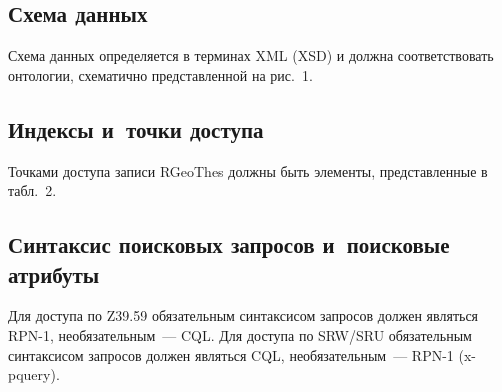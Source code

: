 \begin{multicols}{2}
  \subsection{Схема данных}
  
  Схема данных определяется в терминах {XML} (XSD) и должна соответствовать 
онтологии, схематично представленной на рис.~1.
  
  \subsection{Индексы и~точки доступа}
  
  Точками доступа записи \mbox{RGeoThes} должны быть элементы, представленные в 
табл.~2.
  
  \subsection{Синтаксис поисковых запросов и~поисковые атрибуты}
  
  Для доступа по Z39.59 обязательным синтаксисом запросов должен являться 
RPN-1, необязательным~--- {CQL}. Для доступа по \mbox{SRW/SRU} обязательным 
синтаксисом запросов должен являться {CQL}, необязательным~--- RPN-1 
  ({x-pquery}).
   
   \begin{table*}\small
   \begin{center}
   \vspace*{2ex}
   

\end{center}
\end{table*}
\end{multicols}
